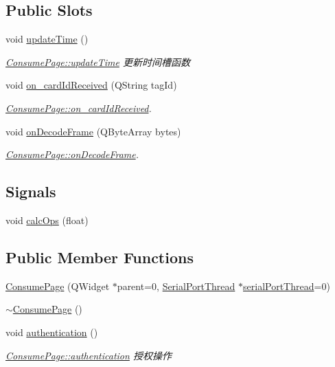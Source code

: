 \subsection*{Public Slots}
\begin{DoxyCompactItemize}
\item 
void \mbox{\hyperlink{class_consume_page_ad00cdadd4302bfb963b4e1c2487b7653}{update\+Time}} ()
\begin{DoxyCompactList}\small\item\em \mbox{\hyperlink{class_consume_page_ad00cdadd4302bfb963b4e1c2487b7653}{Consume\+Page\+::update\+Time}} 更新时间槽函数 \end{DoxyCompactList}\item 
void \mbox{\hyperlink{class_consume_page_a10832a40b02705ec9c951673e1a7e6da}{on\+\_\+card\+Id\+Received}} (Q\+String tag\+Id)
\begin{DoxyCompactList}\small\item\em \mbox{\hyperlink{class_consume_page_a10832a40b02705ec9c951673e1a7e6da}{Consume\+Page\+::on\+\_\+card\+Id\+Received}}. \end{DoxyCompactList}\item 
void \mbox{\hyperlink{class_consume_page_aad2165e62407257cd5a061a75e3e8cd2}{on\+Decode\+Frame}} (Q\+Byte\+Array bytes)
\begin{DoxyCompactList}\small\item\em \mbox{\hyperlink{class_consume_page_aad2165e62407257cd5a061a75e3e8cd2}{Consume\+Page\+::on\+Decode\+Frame}}. \end{DoxyCompactList}\end{DoxyCompactItemize}
\subsection*{Signals}
\begin{DoxyCompactItemize}
\item 
void \mbox{\hyperlink{class_consume_page_ac51abb2cb079fc3884f4999d6467ad1b}{calc\+Ops}} (float)
\end{DoxyCompactItemize}
\subsection*{Public Member Functions}
\begin{DoxyCompactItemize}
\item 
\mbox{\hyperlink{class_consume_page_a2215feb8cdf2b12d83d4b6ff9f567661}{Consume\+Page}} (Q\+Widget $\ast$parent=0, \mbox{\hyperlink{class_serial_port_thread}{Serial\+Port\+Thread}} $\ast$\mbox{\hyperlink{class_consume_page_ae29d14c1d1d1ce6e6281a2dec3ade6a0}{serial\+Port\+Thread}}=0)
\item 
\mbox{\hyperlink{class_consume_page_a9a7b49db8398a51d064d8a96f6f78e61}{$\sim$\+Consume\+Page}} ()
\item 
void \mbox{\hyperlink{class_consume_page_a26ad9f5afc48a91b04f6ba99f524dc44}{authentication}} ()
\begin{DoxyCompactList}\small\item\em \mbox{\hyperlink{class_consume_page_a26ad9f5afc48a91b04f6ba99f524dc44}{Consume\+Page\+::authentication}} 授权操作 \end{DoxyCompactList}\end{DoxyCompactItemize}

